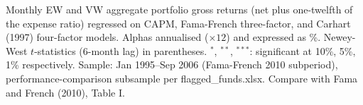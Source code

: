 \begin{table}[!htbp]
\centering
{}
\setlength{\tabletempwidth}{\wd\tabletempbox}
\ifdim\tabletempwidth>\linewidth\setlength{\tabletempwidth}{\linewidth}\fi
\begin{minipage}{\tabletempwidth}
\captionsetup{width=\linewidth}
\caption{\label{tab:port_agg_alpha_FF}Active vs.\ Passive Aggregate Portfolio Alpha (\%, Annualised) -- FF Subperiod}
\ifdim\wd\tabletempbox>\linewidth
  \resizebox{\linewidth}{!}{\usebox{\tabletempbox}}
\else
  \usebox{\tabletempbox}
\fi
\par\medskip
\begin{singlespace}\footnotesize\noindent
Monthly EW and VW aggregate portfolio gross returns (net plus one-twelfth of the expense ratio) regressed on CAPM, Fama-French three-factor, and Carhart (1997) four-factor models. Alphas annualised ($\times 12$) and expressed as \%. Newey-West $t$-statistics (6-month lag) in parentheses. $^{*}$, $^{**}$, $^{***}$: significant at 10\%, 5\%, 1\% respectively. Sample: Jan 1995--Sep 2006 (Fama-French 2010 subperiod), performance-comparison subsample per flagged\_funds.xlsx. Compare with Fama and French (2010), Table I.
\end{singlespace}
\end{minipage}
\end{table}

